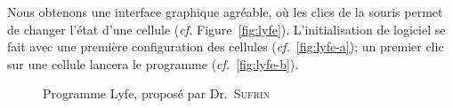 \documentclass[a4paper,11pt,french]{report}
\begin{document}
Nous obtenons une interface graphique agréable, où les clics de la souris permet de changer l'état d'une cellule (\emph{cf.} Figure~\vref{fig:lyfe}). L'initialisation de logiciel se fait avec une première configuration des cellules (\emph{cf.}~\vref{fig:lyfe-a}); un premier clic sur une cellule lancera le programme (\emph{cf.}~\vref{fig:lyfe-b}).

\begin{figure}[htp]
  \centering
  \vspace{1pt}               
  \caption{Programme Lyfe, proposé par Dr.\ \textsc{Sufrin}}
  \label{fig:lyfe}
\end{figure}
\end{document}
